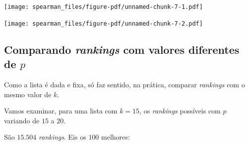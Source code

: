 \documentclass[
  letterpaper,
  DIV=11,
  numbers=noendperiod]{scrreprt}
\begin{document}
\begin{center}
\texttt{[image: spearman\_files/figure-pdf/unnamed-chunk-7-1.pdf]}
\end{center}

\begin{center}
\texttt{[image: spearman\_files/figure-pdf/unnamed-chunk-7-2.pdf]}
\end{center}

\subsection{\texorpdfstring{Comparando \emph{rankings} com valores
diferentes de
$p$}{Comparando rankings com valores diferentes de }}\label{comparando-rankings-com-valores-diferentes-de-p-1}

Como a lista é dada e fixa, só faz sentido, na prática, comparar
\emph{rankings} com o mesmo valor de $k$.

Vamos examinar, para uma lista com $k = 15$, os \emph{rankings}
possíveis com $p$ variando de $15$ a $20$.

São $15.504$ \emph{rankings}. Eis os $100$ melhores:
\end{document}

